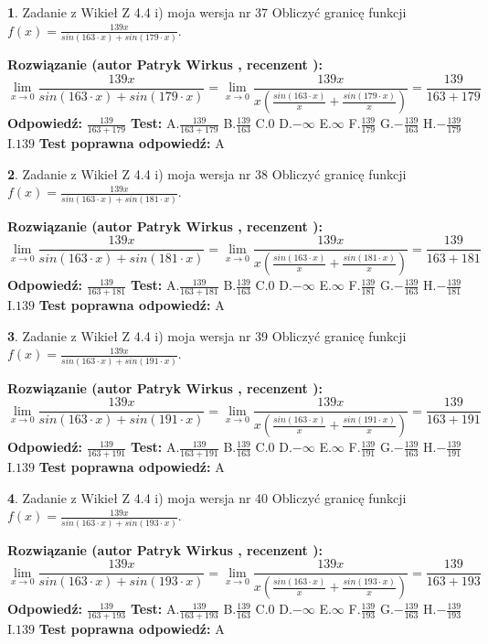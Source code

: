\documentclass[12pt, a4paper]{article}
\theoremstyle{definition} %
\newtheorem{zad}{}
\newcommand{\zadStart}[1]{\begin{zad}#1\newline}
\newcommand{\zadStop}{\end{zad}}
\newcommand{\rozwStart}[2]{\noindent \textbf{Rozwiązanie (autor #1 , recenzent #2): }\newline}
\newcommand{\rozwStop}{\newline}
\newcommand{\odpStart}{\noindent \textbf{Odpowiedź:}\newline}
\newcommand{\odpStop}{\newline}
\newcommand{\testStart}{\noindent \textbf{Test:}\newline}
\newcommand{\testStop}{\newline}
\newcommand{\kluczStart}{\noindent \textbf{Test poprawna odpowiedź:}\newline}
\newcommand{\kluczStop}{\newline}
\begin{document}
\zadStart{Zadanie z Wikieł Z 4.4 i) moja wersja nr 37}
Obliczyć granicę funkcji $f(x)=\frac{139x}{sin(163\cdot x) +sin(179\cdot x)}$.
\zadStop
\rozwStart{Patryk Wirkus}{}
$$\lim\limits_{x\to 0}\frac{139x}{sin(163\cdot x) +sin(179\cdot x)}=\lim\limits_{x\to 0}\frac{139x}{x(\frac{sin(163\cdot x)}{x}+\frac{sin(179\cdot x)}{x})}=\frac{139}{163+179}$$
\rozwStop
\odpStart
$\frac{139}{163+179}$
\odpStop
\testStart
A.$\frac{139}{163+179}$
B.$\frac{139}{163}$
C.$0$
D.$-\infty$
E.$\infty$
F.$\frac{139}{179}$
G.$-\frac{139}{163}$
H.$-\frac{139}{179}$
I.$139$
\testStop
\kluczStart
A
\kluczStop



\zadStart{Zadanie z Wikieł Z 4.4 i) moja wersja nr 38}
Obliczyć granicę funkcji $f(x)=\frac{139x}{sin(163\cdot x) +sin(181\cdot x)}$.
\zadStop
\rozwStart{Patryk Wirkus}{}
$$\lim\limits_{x\to 0}\frac{139x}{sin(163\cdot x) +sin(181\cdot x)}=\lim\limits_{x\to 0}\frac{139x}{x(\frac{sin(163\cdot x)}{x}+\frac{sin(181\cdot x)}{x})}=\frac{139}{163+181}$$
\rozwStop
\odpStart
$\frac{139}{163+181}$
\odpStop
\testStart
A.$\frac{139}{163+181}$
B.$\frac{139}{163}$
C.$0$
D.$-\infty$
E.$\infty$
F.$\frac{139}{181}$
G.$-\frac{139}{163}$
H.$-\frac{139}{181}$
I.$139$
\testStop
\kluczStart
A
\kluczStop



\zadStart{Zadanie z Wikieł Z 4.4 i) moja wersja nr 39}
Obliczyć granicę funkcji $f(x)=\frac{139x}{sin(163\cdot x) +sin(191\cdot x)}$.
\zadStop
\rozwStart{Patryk Wirkus}{}
$$\lim\limits_{x\to 0}\frac{139x}{sin(163\cdot x) +sin(191\cdot x)}=\lim\limits_{x\to 0}\frac{139x}{x(\frac{sin(163\cdot x)}{x}+\frac{sin(191\cdot x)}{x})}=\frac{139}{163+191}$$
\rozwStop
\odpStart
$\frac{139}{163+191}$
\odpStop
\testStart
A.$\frac{139}{163+191}$
B.$\frac{139}{163}$
C.$0$
D.$-\infty$
E.$\infty$
F.$\frac{139}{191}$
G.$-\frac{139}{163}$
H.$-\frac{139}{191}$
I.$139$
\testStop
\kluczStart
A
\kluczStop



\zadStart{Zadanie z Wikieł Z 4.4 i) moja wersja nr 40}
Obliczyć granicę funkcji $f(x)=\frac{139x}{sin(163\cdot x) +sin(193\cdot x)}$.
\zadStop
\rozwStart{Patryk Wirkus}{}
$$\lim\limits_{x\to 0}\frac{139x}{sin(163\cdot x) +sin(193\cdot x)}=\lim\limits_{x\to 0}\frac{139x}{x(\frac{sin(163\cdot x)}{x}+\frac{sin(193\cdot x)}{x})}=\frac{139}{163+193}$$
\rozwStop
\odpStart
$\frac{139}{163+193}$
\odpStop
\testStart
A.$\frac{139}{163+193}$
B.$\frac{139}{163}$
C.$0$
D.$-\infty$
E.$\infty$
F.$\frac{139}{193}$
G.$-\frac{139}{163}$
H.$-\frac{139}{193}$
I.$139$
\testStop
\kluczStart
A
\kluczStop
\end{document}
